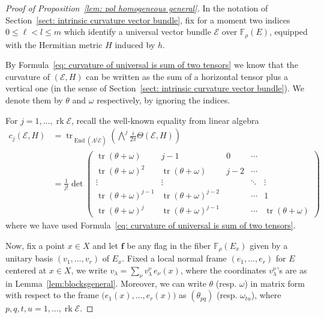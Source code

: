 \documentclass[a4paper]{amsart}
\theoremstyle{plain}%
\theoremstyle{definition}
\theoremstyle{remark}
\newcommand{\FF}{\mathbb{F}}
\begin{document}
\begin{proof}[Proof of Proposition~\ref{lem: pol homogeneous general}]
	In the notation of Section~\ref{sect: intrinsic curvature vector bundle}, fix for a moment two indices $ 0 \le \ell < l \le m $ which identify a universal vector bundle $ \mathcal{E} $ over $ \FF_{\rho}(E) $, equipped with the Hermitian metric $ H $ induced by $ h $.
	
	By Formula~\eqref{eq: curvature of universal is sum of two tensors} we know that the curvature of $ (\mathcal{E},H) $ can be written as the sum of a horizontal tensor plus a vertical one (in the sense of Section~\ref{sect: intrinsic curvature vector bundle}).
	We denote them by $ \theta $ and $ \omega $ respectively, by ignoring the indices.
	
	For $ j = 1,\dots,\operatorname{rk} \mathcal{E} $, recall the well-known equality from linear algebra
	\begin{align*}
		c_{j}(\mathcal{E},H) &= \operatorname{tr}_{\operatorname{End}(\Lambda^{j}\mathcal{E})} \left( {\bigwedge}^{j} \frac{i}{2\pi} \Theta(\mathcal{E},H) \right) \\
		&= \frac{1}{j !} \det \begin{pmatrix}
			\operatorname{tr}(\theta + \omega) & j - 1 & 0 & \cdots &  \\
			\operatorname{tr} (\theta + \omega)^2 & \operatorname{tr}(\theta + \omega) & j - 2 & \cdots &  \\
			\vdots & \vdots &  & \ddots & \vdots \\
			\operatorname{tr}(\theta + \omega)^{j - 1} & \operatorname{tr}(\theta + \omega)^{j - 2} &  & \cdots & 1 \\
			\operatorname{tr}(\theta + \omega)^{j} & \operatorname{tr}(\theta + \omega)^{j - 1} &  & \cdots & \operatorname{tr}(\theta + \omega)
		\end{pmatrix}
	\end{align*}
	where we have used Formula~\eqref{eq: curvature of universal is sum of two tensors}.
	
	Now, fix a point $ x \in X $ and let $ \mathbf{f} $ be any flag in the fiber $ \FF_{\rho}(E_x) $ given by a unitary basis $ (v_1,\dots,v_r) $ of $ E_x $.
	Fixed a local normal frame $ (e_1,\dots,e_r) $ for $ E $ centered at $ x \in X $, we write $ v_{\lambda} = \sum_{\nu} v_{\lambda}^{\nu} \,e_{\nu}(x) $, where the coordinates $ v_{\lambda}^{\nu} $'s are as in Lemma~\ref{lem:blocksgeneral}.
	Moreover, we can write $ \theta $ (resp. $ \omega $) in matrix form with respect to the frame $ \big( e_1(x),\dots,e_r(x) \big) $ as $ (\theta_{pq}) $ (resp. $ \omega_{tu} $), where $ p,q,t,u = 1 , \dots, \operatorname{rk} \mathcal{E} $.
	

\end{proof}
\end{document}
